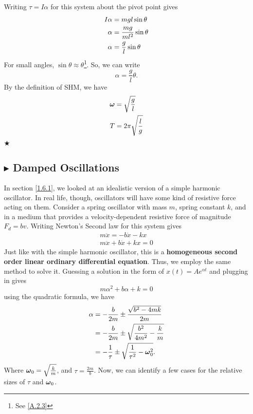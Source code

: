\noindent Writing $\tau = I\alpha$ for this system about the pivot point gives
\begin{align}
    I\alpha &= mgl\sin\theta \nonumber \\
    \alpha &= \frac{mg}{ml^2}\sin\theta \nonumber \\
    \alpha &= \frac{g}{l}\sin\theta
\end{align}
\noindent For small angles, $\sin\theta \approx \theta$\footnote{See \ref{A.2.3}}. So, we can write 
\begin{equation*}
    \alpha = \frac{g}{l}\theta.
\end{equation*}
\noindent By the definition of SHM, we have
\begin{align}
    \boldsymbol{\omega} &= \sqrt{\frac{g}{l}} \nonumber \\
    T &= 2\pi\sqrt{\frac{l}{g}}
\end{align}
$\bigstar$

\subsection{\color{Orchid} $\blacktriangleright$ \color{black} Damped Oscillations} \label{1.6.4}
In section \ref{1.6.1}, we looked at an idealistic version of a simple harmonic oscillator. In real life, though, oscillators will have some kind of resistive force acting on them. Consider a spring oscillator with mass $m$, spring constant $k$, and in a medium that provides a velocity-dependent resistive force of magnitude $F_d = bv$. Writing Newton's Second law for this system gives
\begin{gather*}
    m\ddot{x} = -b\dot{x} -kx \\
    m\ddot{x} + b\dot{x} + kx = 0
\end{gather*}
\noindent Just like with the simple harmonic oscillator, this is a \textbf{homogeneous second order linear ordinary differential equation}. Thus, we employ the same method to solve it. Guessing a solution in the form of $x(t) = Ae^{\alpha t}$ and plugging in gives
\begin{equation}
    m\alpha^2 + b\alpha + k = 0
\end{equation}
\noindent using the quadratic formula, we have
\begin{align}
    \alpha &= -\frac{b}{2m} \pm \frac{\sqrt{b^2-4mk}}{2m} \nonumber \\
    &= -\frac{b}{2m} \pm \sqrt{\frac{b^2}{4m^2} - \frac{k}{m}} \nonumber \\
    &= -\frac{1}{\tau} \pm \sqrt{\frac{1}{\tau^2} - \boldsymbol{\omega}_0^2}.
\end{align}
\noindent Where $\boldsymbol{\omega}_0 = \sqrt{\frac{k}{m}}$, and $\tau = \frac{2m}{b}$. Now, we can identify a few cases for the relative sizes of $\tau$ and $\boldsymbol{\omega}_0$. 

